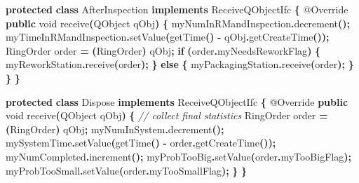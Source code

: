 \documentclass[
]{book}
\newenvironment{Shaded}{\begin{snugshade}}{\end{snugshade}}
\newcommand{\AttributeTok}[1]{\textcolor[rgb]{0.77,0.63,0.00}{#1}}
\newcommand{\CommentTok}[1]{\textcolor[rgb]{0.56,0.35,0.01}{\textit{#1}}}
\newcommand{\ControlFlowTok}[1]{\textcolor[rgb]{0.13,0.29,0.53}{\textbf{#1}}}
\newcommand{\DataTypeTok}[1]{\textcolor[rgb]{0.13,0.29,0.53}{#1}}
\newcommand{\FunctionTok}[1]{\textcolor[rgb]{0.00,0.00,0.00}{#1}}
\newcommand{\KeywordTok}[1]{\textcolor[rgb]{0.13,0.29,0.53}{\textbf{#1}}}
\newcommand{\NormalTok}[1]{#1}
\newcommand{\OperatorTok}[1]{\textcolor[rgb]{0.81,0.36,0.00}{\textbf{#1}}}
\theoremstyle{definition}
\theoremstyle{definition}
\theoremstyle{definition}
\theoremstyle{definition}
\theoremstyle{remark}
\begin{document}
\begin{Shaded}
\begin{Highlighting}[]
\KeywordTok{protected} \KeywordTok{class}\NormalTok{ AfterInspection }\KeywordTok{implements}\NormalTok{ ReceiveQObjectIfc }\OperatorTok{\{}
    \AttributeTok{@Override}
    \KeywordTok{public} \DataTypeTok{void} \FunctionTok{receive}\OperatorTok{(}\NormalTok{QObject qObj}\OperatorTok{)} \OperatorTok{\{}
\NormalTok{        myNumInRMandInspection}\OperatorTok{.}\FunctionTok{decrement}\OperatorTok{();}
\NormalTok{        myTimeInRMandInspection}\OperatorTok{.}\FunctionTok{setValue}\OperatorTok{(}\FunctionTok{getTime}\OperatorTok{()} \OperatorTok{{-}}\NormalTok{ qObj}\OperatorTok{.}\FunctionTok{getCreateTime}\OperatorTok{());}
\NormalTok{        RingOrder order }\OperatorTok{=} \OperatorTok{(}\NormalTok{RingOrder}\OperatorTok{)}\NormalTok{ qObj}\OperatorTok{;}
        \ControlFlowTok{if} \OperatorTok{(}\NormalTok{order}\OperatorTok{.}\FunctionTok{myNeedsReworkFlag}\OperatorTok{)} \OperatorTok{\{}
\NormalTok{            myReworkStation}\OperatorTok{.}\FunctionTok{receive}\OperatorTok{(}\NormalTok{order}\OperatorTok{);}
        \OperatorTok{\}} \ControlFlowTok{else} \OperatorTok{\{}
\NormalTok{            myPackagingStation}\OperatorTok{.}\FunctionTok{receive}\OperatorTok{(}\NormalTok{order}\OperatorTok{);}
        \OperatorTok{\}}
    \OperatorTok{\}}
\OperatorTok{\}}

\KeywordTok{protected} \KeywordTok{class}\NormalTok{ Dispose }\KeywordTok{implements}\NormalTok{ ReceiveQObjectIfc }\OperatorTok{\{}
    \AttributeTok{@Override}
    \KeywordTok{public} \DataTypeTok{void} \FunctionTok{receive}\OperatorTok{(}\NormalTok{QObject qObj}\OperatorTok{)} \OperatorTok{\{}
        \CommentTok{// collect final statistics}
\NormalTok{        RingOrder order }\OperatorTok{=} \OperatorTok{(}\NormalTok{RingOrder}\OperatorTok{)}\NormalTok{ qObj}\OperatorTok{;}
\NormalTok{        myNumInSystem}\OperatorTok{.}\FunctionTok{decrement}\OperatorTok{();}
\NormalTok{        mySystemTime}\OperatorTok{.}\FunctionTok{setValue}\OperatorTok{(}\FunctionTok{getTime}\OperatorTok{()} \OperatorTok{{-}}\NormalTok{ order}\OperatorTok{.}\FunctionTok{getCreateTime}\OperatorTok{());}
\NormalTok{        myNumCompleted}\OperatorTok{.}\FunctionTok{increment}\OperatorTok{();}
\NormalTok{        myProbTooBig}\OperatorTok{.}\FunctionTok{setValue}\OperatorTok{(}\NormalTok{order}\OperatorTok{.}\FunctionTok{myTooBigFlag}\OperatorTok{);}
\NormalTok{        myProbTooSmall}\OperatorTok{.}\FunctionTok{setValue}\OperatorTok{(}\NormalTok{order}\OperatorTok{.}\FunctionTok{myTooSmallFlag}\OperatorTok{);}
    \OperatorTok{\}}
\OperatorTok{\}}


\end{Highlighting}
\end{Shaded}
\end{document}
